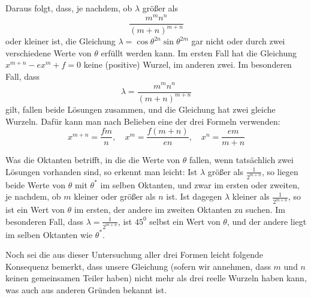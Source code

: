 Daraus folgt, dass, je nachdem, ob $\lambda$ größer als
\[
\frac{m^m n^n}{(m+n)^{m+n}}
\]
oder kleiner ist, die Gleichung $\lambda=\cos\theta^{2n}\sin\theta^{2m}$ gar nicht oder durch zwei verschiedene Werte von $\theta$ erfüllt werden kann. Im ersten Fall hat die Gleichung $x^{m+n}-ex^m+f=0$ keine (positive) Wurzel, im anderen zwei. Im besonderen Fall, dass
\[
\lambda=\frac{m^m n^n}{(m+n)^{m+n}}
\]
gilt, fallen beide Lösungen zusammen, und die Gleichung hat zwei gleiche Wurzeln. Dafür kann man nach Belieben eine der drei Formeln verwenden:
\[
x^{m+n}=\frac{fm}{n},\quad
x^m=\frac{f(m+n)}{en},\quad
x^n=\frac{em}{m+n}
\]

Was die Oktanten betrifft, in die die Werte von $\theta$ fallen, wenn tatsächlich zwei Lösungen vorhanden sind, so erkennt man leicht: Ist $\lambda$ größer als $\frac{1}{2^{m+n}}$, so liegen beide Werte von $\theta$ mit $\theta^*$ im selben Oktanten, und zwar im ersten oder zweiten, je nachdem, ob $m$ kleiner oder größer als $n$ ist. Ist dagegen $\lambda$ kleiner als $\frac{1}{2^{m+n}}$, so ist ein Wert von $\theta$ im ersten, der andere im zweiten Oktanten zu suchen. Im besonderen Fall, dass $\lambda=\frac{1}{2^{m+n}}$, ist $45^0$ selbst ein Wert von $\theta$, und der andere liegt im selben Oktanten wie $\theta^*$.

Noch sei die aus dieser Untersuchung aller drei Formen leicht folgende Konsequenz bemerkt, dass unsere Gleichung (sofern wir annehmen, dass $m$ und $n$ keinen gemeinsamen Teiler haben) nicht mehr als drei reelle Wurzeln haben kann, was auch aus anderen Gründen bekannt ist.

